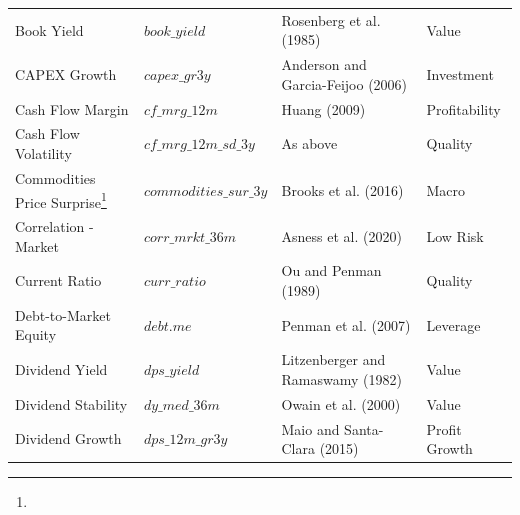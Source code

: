 \documentclass[preprint,12pt,authoryear]{elsarticle}
\begin{document}
\begin{appendices}
\begin{table}[pt]
\begin{tabularx}{\linewidth}{>{\raggedright\arraybackslash}m{3cm}>{\raggedright\arraybackslash}m{3.5cm}>{\raggedright\arraybackslash}m{4cm}>{\raggedright\arraybackslash}m{4cm}}
Book Yield & $book\_yield$ & Rosenberg et al. (1985) & Value \\
CAPEX Growth & $capex\_gr3y$ & Anderson and Garcia-Feijoo (2006) & Investment \\
Cash Flow Margin & $cf\_mrg\_12m$ & Huang (2009) & Profitability \\
Cash Flow Volatility & $cf\_mrg\_12m\_sd\_3y$ &  As above & Quality \\
Commodities Price Surprise\footnote{} & $commodities\_sur\_3y$ & Brooks et al. (2016) & Macro \\
Correlation - Market & $corr\_mrkt\_36m$ & Asness et al. (2020) & Low Risk \\
Current Ratio & $curr\_ratio$ & Ou and Penman (1989) & Quality \\
Debt-to-Market Equity & $debt.me$ & Penman et al. (2007) & Leverage \\
Dividend Yield & $dps\_yield$ & Litzenberger and Ramaswamy (1982) & Value \\
Dividend Stability & $dy\_med\_36m$ & Owain et al. (2000) & Value \\
Dividend Growth & $dps\_12m\_gr3y$ & Maio and Santa-Clara (2015)  & Profit Growth \\
\hline
\end{tabularx}
\label{mostcitedarticles}
\end{table}


\end{appendices}
\end{document}
